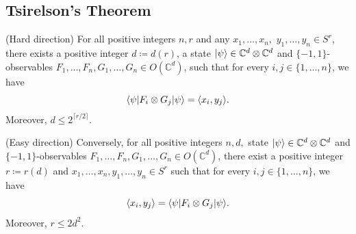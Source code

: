 \subsection{Tsirelson's Theorem}
	\begin{theo}[Tsirelson] \label{theo:Tsirelson}
		(Hard direction) For all positive integers $n, r$ and any $x_1,\dots,x_n,$ $y_1,\dots,y_n\in S^r$, there exists a positive integer $d\coloneqq d(r)$, a state $\vert {\psi} \rangle\in\mathbb{C}^d\otimes\mathbb{C}^d$ and $\{-1,1\}$-observables $F_1,\dots,F_n,G_1,\dots,G_n\in O(\mathbb{C}^d)$, such that for every $i,j\in\{1,\dots,n\}$, we have
		\begin{equation}
			\langle {\psi} \vert F_i\otimes G_j \vert {\psi} \rangle = \langle{x_i},{y_j}\rangle.
		\end{equation}
		Moreover, $d\leq 2^{\lceil r/2 \rceil}$.
		
		(Easy direction) Conversely, for all positive integers $n,d,$ state $\vert {\psi} \rangle\in \mathbb{C}^d\otimes\mathbb{C}^d$ and $\{-1,1\}$-observables $F_1,\dots,F_n,G_1,\dots,G_n\in O(\mathbb{C}^d)$, there exist a positive integer $r\coloneqq r(d)$ and $x_1,\dots,x_n,y_1,\dots,y_n\in S^r$ such that for every $i,j\in\{1,\dots,n\}$, we have
		\begin{equation}
			\langle{x_i},{y_j}\rangle = \langle {\psi} \vert F_i\otimes G_j \vert {\psi} \rangle.
		\end{equation}
		Moreover, $r\leq 2d^2$.
	\end{theo}
